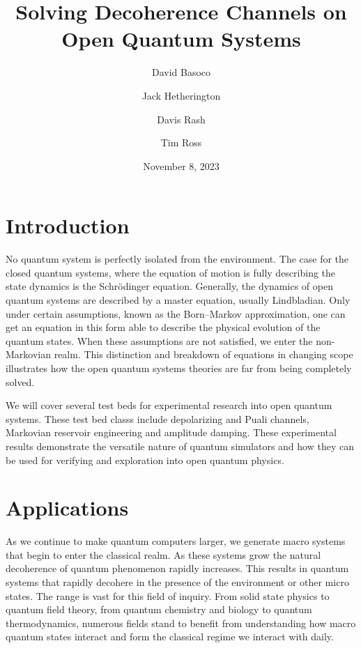 \documentclass[12pt]{article}
\title{Solving Decoherence Channels on Open Quantum Systems}
\author{David Basoco \and Jack Hetherington \and Davis Rash \and Tim Ross}
\date{November 8, 2023}
\begin{document}
  \maketitle


  \section{Introduction}

  No quantum system is perfectly isolated from the environment. The case for the closed quantum systems, where the equation of motion is fully describing the state dynamics is the Schr\"{o}dinger equation. Generally, the dynamics of open quantum systems are described by a master equation, usually Lindbladian. Only under certain assumptions, known as the Born--Markov approximation, one can get an equation in this form able to describe the physical evolution of the quantum states. When these assumptions are not satisfied, we enter the non-Markovian realm. This distinction and breakdown of equations in changing scope illustrates how the open quantum systems theories are far from being completely solved.

  We will cover several test beds for experimental research into open quantum systems. These test bed classs include depolarizing and Puali channels, Markovian reservoir engineering and amplitude damping. These experimental results demonstrate the versatile nature of quantum simulators and how they can be used for verifying and exploration into open quantum physics.


  \section{Applications}

  As we continue to make quantum computers larger, we generate macro systems that begin to enter the classical realm. As these systems grow the natural decoherence of quantum phenomenon rapidly increases. This results in quantum systems that rapidly decohere in the presence of the environment or other micro states. The range is vast for this field of inquiry. From solid state physics to quantum field theory, from quantum chemistry and biology to quantum thermodynamics, numerous fields stand to benefit from understanding how macro quantum states interact and form the classical regime we interact with daily.
\end{document}
